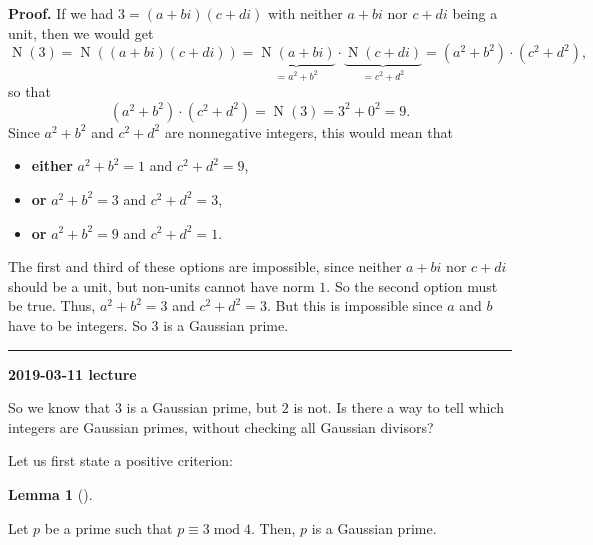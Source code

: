 \documentclass[numbers=enddot,12pt,final,onecolumn,notitlepage]{scrartcl}%
\numberwithin{exer}{subsection}
\theoremstyle{definition}
\newtheorem{lem}[theo]{Lemma}
\newenvironment{lemma}[1][]
{\begin{lem}[#1]\begin{leftbar}}
{\end{leftbar}\end{lem}}
\newenvironment{proof}[1][Proof]{\noindent\textbf{#1.} }{\ \rule{0.5em}{0.5em}}
\begin{document}
\begin{proof}
If we had $3=\left(  a+bi\right)  \left(  c+di\right)  $ with neither $a+bi$
nor $c+di$ being a unit, then we would get%
\[
\operatorname*{N}\left(  3\right)  =\operatorname*{N}\left(  \left(
a+bi\right)  \left(  c+di\right)  \right)  =\underbrace{\operatorname*{N}%
\left(  a+bi\right)  }_{=a^{2}+b^{2}}\cdot\underbrace{\operatorname*{N}\left(
c+di\right)  }_{=c^{2}+d^{2}}=\left(  a^{2}+b^{2}\right)  \cdot\left(
c^{2}+d^{2}\right)  ,
\]
so that%
\[
\left(  a^{2}+b^{2}\right)  \cdot\left(  c^{2}+d^{2}\right)
=\operatorname*{N}\left(  3\right)  =3^{2}+0^{2}=9.
\]
Since $a^{2}+b^{2}$ and $c^{2}+d^{2}$ are nonnegative integers, this would
mean that

\begin{itemize}
\item \textbf{either} $a^{2}+b^{2}=1$ and $c^{2}+d^{2}=9$,

\item \textbf{or }$a^{2}+b^{2}=3$ and $c^{2}+d^{2}=3$,

\item \textbf{or }$a^{2}+b^{2}=9$ and $c^{2}+d^{2}=1$.
\end{itemize}

The first and third of these options are impossible, since neither $a+bi$ nor
$c+di$ should be a unit, but non-units cannot have norm $1$. So the second
option must be true. Thus, $a^{2}+b^{2}=3$ and $c^{2}+d^{2}=3$. But this is
impossible since $a$ and $b$ have to be integers. So $3$ is a Gaussian prime.
\end{proof}

\begin{center}
\textbf{2019-03-11 lecture}
\end{center}

So we know that $3$ is a Gaussian prime, but $2$ is not. Is there a way to
tell which integers are Gaussian primes, without checking all Gaussian divisors?

Let us first state a positive criterion:

\begin{lemma}
\label{lem.Z[i].gauss.prime.3mod4}Let $p$ be a prime such that $p\equiv
3\operatorname{mod}4$. Then, $p$ is a Gaussian prime.
\end{lemma}
\end{document}
